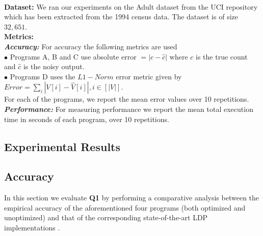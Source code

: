 \\\textbf{Dataset:}
We ran our experiments on the Adult dataset from the UCI repository \cite{UCI}  which has been extracted from the 1994 census data. The dataset is of size $32,651$.
\\\textbf{Metrics:}
\\\textbf{\textit{Accuracy:}} For accuracy the following metrics are used
\\$\bullet$ Programs A, B and C use absolute error $ =|c-\hat{c}|$ where $c$ is the true count and $\hat{c}$ is the noisy output.\\ $\bullet$ Programs D uses the $L1-Norm$ error metric given  by $Error=\sum_{i}|V[i]-\hat{V}[i]|, i \in [|V|]$.\\
For each of the programs, we report the mean error values over 10 repetitions.\\
\textbf{\textit{Performance:}} For measuring performance we report the mean total execution time in seconds of each program, over 10 repetitions. 



\subsection{Experimental Results}
\subsection*{Accuracy}
In this section we evaluate \textbf{Q1} by performing a comparative analysis between the empirical accuracy of the aforementioned four \system programs (both optimized and unoptimized) and that of the corresponding state-of-the-art \textsf{LDP} implementations \cite{LDP1}. %

